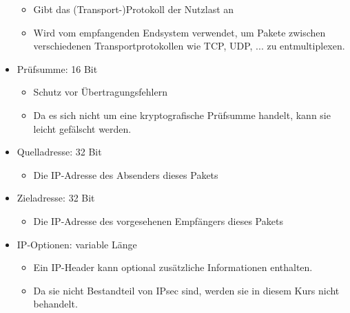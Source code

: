 \documentclass[a4paper]{article}
\begin{document}
\begin{multicols}{3}
\begin{itemize}
              \begin{itemize}
                  \item
                        Gibt das (Transport-)Protokoll der Nutzlast an
                  \item
                        Wird vom empfangenden Endsystem verwendet, um Pakete zwischen
                        verschiedenen Transportprotokollen wie TCP, UDP, ... zu
                        entmultiplexen.
              \end{itemize}
        \item
              Prüfsumme: 16 Bit

              \begin{itemize}
                  \item
                        Schutz vor Übertragungsfehlern
                  \item
                        Da es sich nicht um eine kryptografische Prüfsumme handelt, kann sie
                        leicht gefälscht werden.
              \end{itemize}
        \item
              Quelladresse: 32 Bit

              \begin{itemize}
                  \item
                        Die IP-Adresse des Absenders dieses Pakets
              \end{itemize}
        \item
              Zieladresse: 32 Bit

              \begin{itemize}
                  \item
                        Die IP-Adresse des vorgesehenen Empfängers dieses Pakets
              \end{itemize}
        \item
              IP-Optionen: variable Länge

              \begin{itemize}
                  \item
                        Ein IP-Header kann optional zusätzliche Informationen enthalten.
                  \item
                        Da sie nicht Bestandteil von IPsec sind, werden sie in diesem Kurs
                        nicht behandelt.
              \end{itemize}
    \end{itemize}



\end{multicols}
\end{document}
